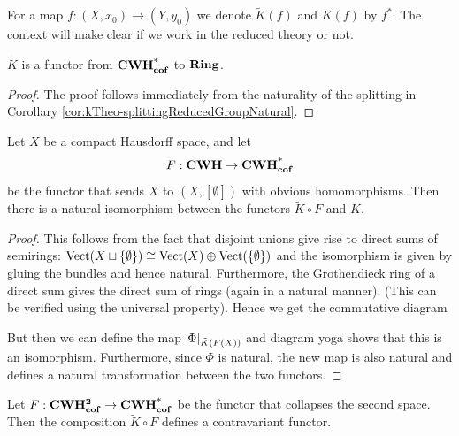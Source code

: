 \begin{remark}
	For a map $f:(X,x_0)\to (Y,y_0)$ we denote $\tilde{K}(f)$ and $K(f)$ by $f^*$. The context will make clear if we work in the reduced theory or not.
\end{remark}
\begin{corollary}
	$\tilde{K}$ is a functor from $\operatorname{\mathbf{CWH^*_{cof}}}$ to $\operatorname{\mathbf{Ring}}$.
\end{corollary}
\begin{proof}
	The proof follows immediately from the naturality of the splitting in Corollary \ref{cor:kTheo-splittingReducedGroupNatural}.
\end{proof}
\begin{corollary}\label{cor:kTheo-unpointedReducedIsNonReduced}
	Let $X$ be a compact Hausdorff space, and let 
	\begin{equation*}
		F:\operatorname{\mathbf{CWH}} \to \operatorname{\mathbf{CWH^*_{cof}}}
	\end{equation*} be the functor that sends $X$ to $(X,[\emptyset])$ with obvious homomorphisms. Then there is a natural isomorphism between the functors $\tilde{K}\circ F$ and $K$. 
\end{corollary}
\begin{proof}
	This follows  from the fact that disjoint unions give rise to direct sums of semirings: $\operatorname{\mathrm{Vect}}(X\sqcup \{\emptyset\})\cong \operatorname{\mathrm{Vect}}(X)\oplus \operatorname{\mathrm{Vect}}(\{\emptyset\})$ and the isomorphism is given by gluing the bundles and hence natural. Furthermore, the Grothendieck ring of a direct sum gives the direct sum of rings (again in a natural manner). (This can be verified using the universal property). Hence we get the commutative diagram
	\begin{center}
	\end{center}
 But then we can define the map $\left.\Phi\right|_{\tilde{K}(F(X))}$ and diagram yoga shows that this is an isomorphism. Furthermore, since $\Phi$ is natural, the new map is also natural and defines a natural transformation between the two functors.
\end{proof}
\begin{definition}
	Let $F:\operatorname{\mathbf{CWH^{2}_{cof}}} \to \operatorname{\mathbf{CWH^*_{cof}}}$ be the functor that collapses the second space. Then the composition $\tilde{K}\circ F$ defines a contravariant functor.
\end{definition}
